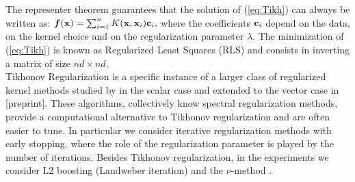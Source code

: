 The representer theorem \cite{dev04representer,MicchPon05Onlearning} guarantees that the solution of (\ref{eq:Tikh}) can always be written as: $\boldsymbol{f}({\bf x}) = \sum_{i=1}^n K({\bf x}, {\bf x}_i){\bf c}_i,$ where the coefficients ${\bf c}_i$ depend on the data, on the kernel choice and on the regularization parameter $\lambda$. The minimization of (\ref{eq:Tikh}) is known as Regularized Least Squares (RLS) and consists in inverting a matrix of size $nd \times nd$.\\
Tikhonov Regularization is a specific instance of a larger class of regularized kernel methods
studied by \cite{LoGerfo08Spectral} in  the scalar case and extended to the vector case in [preprint].
These algorithms, collectively know  spectral regularization methods, provide a  computational alternative to Tikhonov regularization and are often easier to tune. In particular we consider 
iterative regularization methods with early stopping, where the role of the regularization 
parameter is played by the number of iterations. Besides Tikhonov regularization, in  the experiments we consider L2 boosting (Landweber iteration) \cite{bulmann02boosting,LoGerfo08Spectral} and the $\nu$-method \cite{LoGerfo08Spectral}. 
